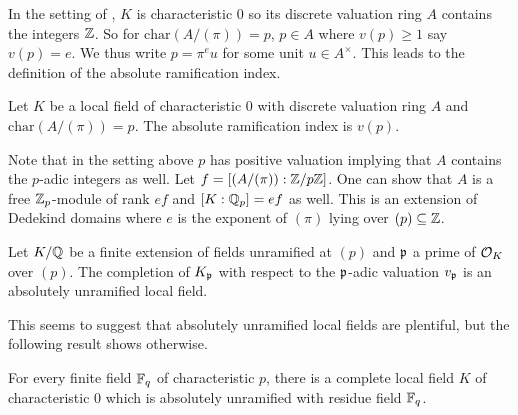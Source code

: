 In the setting of , $K$ is characteristic 0 so its discrete valuation ring $A$ contains the integers $\mathbb{Z}$. So for $\mathrm{char}(A/(\pi))=p$, $p\in A$ where $v(p)\geq 1$ say $v(p)=e$. We thus write $p=\pi^{e}u$ for some unit $u\in A^{\times}$. This leads to the definition of the absolute ramification index. 
\begin{definition}\label{def: absolute ramification index}
  Let $K$ be a local field of characteristic 0 with discrete valuation ring $A$ and $\mathrm{char}(A/(\pi))=p$. The absolute ramification index is $v(p)$. 
\end{definition}
Note that in the setting above $p$ has positive valuation implying that $A$ contains the $p$-adic integers as well. Let $f=[(A/(\pi)):\mathbb{Z}/p\mathbb{Z}]$. One can show that $A$ is a free $\mathbb{Z}_{p}$-module of rank $ef$ and $[K:\mathbb{Q}_{p}]=ef$ as well. This is an extension of Dedekind domains where $e$ is the exponent of $(\pi)$ lying over $(p)\subseteq\mathbb{Z}$.
\begin{example}
  Let $K/\mathbb{Q}$ be a finite extension of fields unramified at $(p)$ and $\mathfrak{p}$ a prime of $\mathcal{O}_{K}$ over $(p)$. The completion of $K_{\mathfrak{p}}$ with respect to the $\mathfrak{p}$-adic valuation $v_{\mathfrak{p}}$ is an absolutely unramified local field.
\end{example} 
This seems to suggest that absolutely unramified local fields are plentiful, but the following result shows otherwise. 
\begin{theorem}\label{thm: unique mixed characteristic extension}
  For every finite field $\mathbb{F}_{q}$ of characteristic $p$, there is a complete local field $K$ of characteristic 0 which is absolutely unramified with residue field $\mathbb{F}_{q}$. 
\end{theorem}
